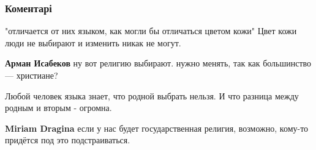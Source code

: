  
 
 
 
 
\subsubsection{Коментарі}

\begin{itemize}
 

"отличается от них языком, как могли бы отличаться цветом кожи"
Цвет кожи люди не выбирают и изменить никак не могут.

\begin{itemize}
 
\textbf{Арман Исабеков} ну вот религию выбирают. нужно менять, так как большинство — христиане?

 
Любой человек языка знает, что родной выбрать нельзя. И что разница между родным и вторым - огромна.

 
\textbf{Miriam Dragina} если у нас будет государственная религия, возможно, кому-то придётся под это подстраиваться.

 

\end{itemize}
\end{itemize}
